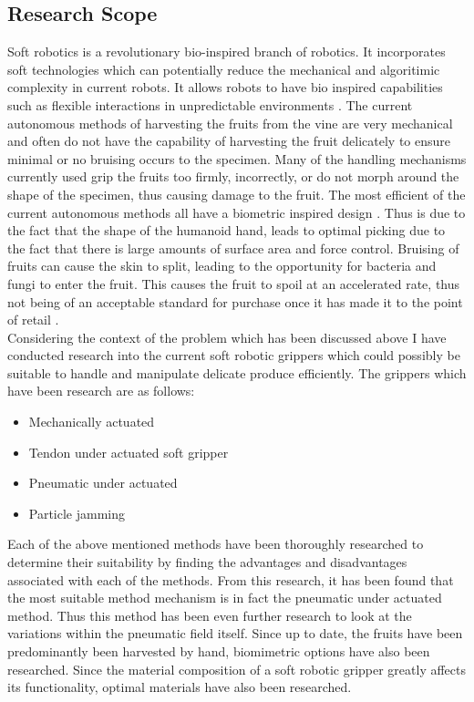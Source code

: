 \documentclass[11pt]{article}
\begin{document}
\subsection{Research Scope}
Soft robotics is a revolutionary bio-inspired branch of robotics. It incorporates soft technologies which can potentially reduce the mechanical and algoritimic complexity in current robots. It allows robots to have bio inspired capabilities such as flexible interactions in unpredictable environments \cite{kim2013soft}. The current autonomous methods of harvesting the fruits from the vine are very mechanical and often do not have the capability of harvesting the fruit delicately to ensure minimal or no bruising occurs to the specimen. Many of the handling mechanisms currently used grip the fruits too firmly, incorrectly, or do not morph around the shape of the specimen, thus causing damage to the fruit. The most efficient of the current autonomous methods all have a biometric inspired design \cite{hassan2015design}. Thus is due to the fact that the shape of the humanoid hand, leads to optimal picking due to the fact that there is large amounts of surface area and force control. Bruising of fruits can cause the skin to split, leading to the opportunity for bacteria and fungi to enter the fruit. This causes the fruit to spoil at an accelerated rate, thus not being of an acceptable standard for purchase once it has made it to the point of retail .
\\
\newline
Considering the context of the problem which has been discussed above I have conducted research into the current soft robotic grippers which could possibly be suitable to handle and manipulate delicate produce efficiently. The grippers which have been research are as follows:
\begin{itemize}
\item Mechanically actuated
\item Tendon under actuated soft gripper
\item Pneumatic under actuated
\item Particle jamming 
\end{itemize}
Each of the above mentioned methods have been thoroughly researched to determine their suitability by finding the advantages and disadvantages associated with each of the methods. From this research, it has been found that the most suitable method mechanism is in fact the pneumatic under actuated method. Thus this method has been even further research to look at the variations within the pneumatic field itself. Since up to date, the fruits have been predominantly been harvested by hand, biomimetric options have also been researched. Since the material composition of a soft robotic gripper greatly affects its functionality, optimal materials have also been researched.
\end{document}
